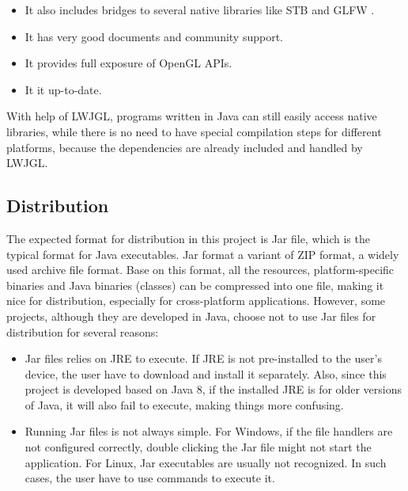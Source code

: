 \documentclass[msc,deptreport, cs]{infthesis}
\begin{document}
\begin{itemize}
  \vspace{-1em}\item It also includes bridges to several native libraries like STB \cite{stb} and GLFW \cite{glfw}.
  \vspace{-1em}\item It has very good documents and community support.
  \vspace{-1em}\item It provides full exposure of OpenGL APIs.
  \vspace{-1em}\item It it up-to-date.
\end{itemize}

With help of LWJGL, programs written in Java can still easily access native libraries, while there is no need to have special compilation steps for different platforms, because the dependencies are already included and handled by LWJGL.

\subsection{Distribution}

The expected format for distribution in this project is Jar file, which is the typical format for Java executables. Jar format a variant of ZIP format, a widely used archive file format. Base on this format, all the resources, platform-specific binaries and Java binaries (classes) can be compressed into one file, making it nice for distribution, especially for cross-platform applications. However, some projects, although they are developed in Java, choose not to use Jar files for distribution for several reasons:
\begin{itemize}
  \item Jar files relies on JRE to execute. If JRE is not pre-installed to the user's device, the user have to download and install it separately. Also, since this project is developed based on Java 8, if the installed JRE is for older versions of Java, it will also fail to execute, making things more confusing.
  \item Running Jar files is not always simple. For Windows, if the file handlers are not configured correctly, double clicking the Jar file might not start the application. For Linux, Jar executables are usually not recognized. In such cases, the user have to use commands to execute it.
\end{itemize}
\end{document}
